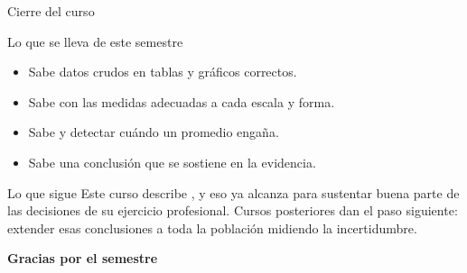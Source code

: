 \documentclass[aspectratio=169,10pt]{beamer}
\begin{document}
\begin{frame}{Cierre del curso}
  \begin{block}{Lo que se lleva de este semestre}
    \scriptsize
    \begin{itemize}\setlength{\itemsep}{0.02cm}
      \item Sabe  datos crudos en tablas y gráficos correctos.
      \item Sabe  con las medidas adecuadas a cada escala y
            forma.
      \item Sabe  y detectar cuándo un promedio
            engaña.
      \item Sabe  una conclusión que se sostiene en
            la evidencia.
    \end{itemize}
  \end{block}

  \vspace{0.15cm}
  \begin{alertblock}{Lo que sigue}
    \scriptsize
    Este curso describe , y eso ya alcanza para
    sustentar buena parte de las decisiones de su ejercicio profesional.
    Cursos posteriores dan el paso siguiente: extender esas conclusiones a
    toda la población midiendo la incertidumbre. 
  \end{alertblock}

  \vspace{0.2cm}
  \begin{center}
    {\large\color{uniAzul}\textbf{Gracias por el semestre}}
  \end{center}
\end{frame}
\end{document}
